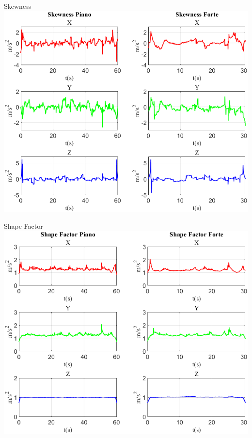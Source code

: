 \documentclass[beamer]{standalone}
\begin{document}
		\begin{frame}{{Skewness}}
				\centering\includegraphics[height=.8\textheight]{figure/Acc/Skewness}
			\end{frame}
	
		\begin{frame}{{Shape Factor}}
				\centering\includegraphics[height=.8\textheight]{figure/Acc/Shape Factor}
			\end{frame}
	
\end{document}
